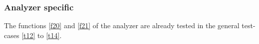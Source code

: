 \subsubsection{Analyzer specific}

The functions  \ref{f20} and \ref{f21} of the analyzer are 
already tested in the general test-cases \ref{t12} to \ref{t14}.



% 
% 
% 
% 
%  
% 
% 
% 
% 
% 
% 
% 
% 
% 
% 
% 
% 
% 
% 
% 
